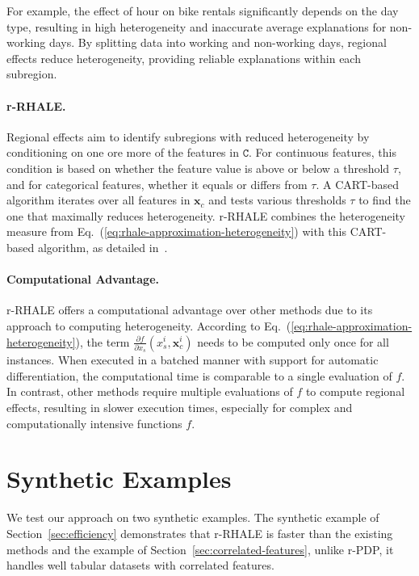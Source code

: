 \documentclass[
twocolumn,
]{ceurart}
\newcommand{\xb}{\mathbf{x}}
\newcommand{\xci}{\mathbf{x}^i_c}
\begin{document}
For example, the effect of hour on bike rentals significantly depends on the day type, resulting in high heterogeneity and inaccurate average explanations for non-working days. By splitting data into working and non-working days, regional effects reduce heterogeneity, providing reliable explanations within each subregion.

\paragraph{r-RHALE.}

Regional effects aim to identify subregions with reduced heterogeneity by conditioning on one ore more of the features in \( \mathtt{C} \). For continuous features, this condition is based on whether the feature value is above or below a threshold \( \tau \), and for categorical features, whether it equals or differs from \( \tau \). A CART-based algorithm iterates over all features in \( \xb_c \) and tests various thresholds \( \tau \) to find the one that maximally reduces heterogeneity.
r-RHALE combines the heterogeneity measure from Eq.~(\ref{eq:rhale-approximation-heterogeneity}) with this CART-based algorithm, as detailed in~\cite{herbinger2023decomposing, gkolemis2024effector}.

\paragraph{Computational Advantage.}

r-RHALE offers a computational advantage over other methods due to its approach to computing heterogeneity. According to Eq.~(\ref{eq:rhale-approximation-heterogeneity}), the term \( \frac{\partial f}{\partial x_s} (x_s^i, \xci) \) needs to be computed only once for all instances. When executed in a batched manner with support for automatic differentiation, the computational time is comparable to a single evaluation of \( f \). In contrast, other methods require multiple evaluations of \( f \) to compute regional effects, resulting in slower execution times, especially for complex and computationally intensive functions \( f \).

\section{Synthetic Examples}

We test our approach on two synthetic examples. The synthetic example of Section~\ref{sec:efficiency} demonstrates that r-RHALE is faster than the existing methods and the example of Section~\ref{sec:correlated-features}, unlike r-PDP, it handles well tabular datasets with correlated features.
\end{document}
